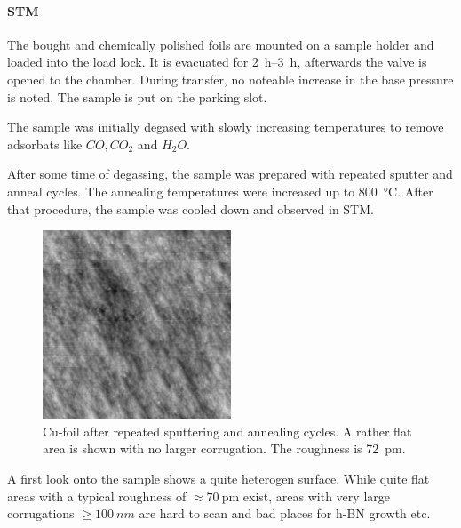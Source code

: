 \paragraph{STM}
The bought and chemically polished foils are mounted on a sample holder and loaded into the load lock. It is evacuated for \SIrange{2}{3}{\hour}, afterwards the valve is opened to the chamber. During transfer, no noteable increase in the base pressure is noted. The sample is put on the parking slot.

The sample was initially degased with slowly increasing temperatures to remove adsorbats like $CO, CO_2$ and $H_2O$.

After some time of degassing, the sample was prepared with repeated sputter and anneal cycles. The annealing temperatures were increased up to \SI{800}{\degreeCelsius}. 
After that procedure, the sample was cooled down and observed in STM.

\begin{figure}[h!]
 \centering
 \includegraphics[width=0.5\textwidth]{./images/F150331-125720.jpg}
 \caption{Cu-foil after repeated sputtering and annealing cycles. A rather flat area is shown with no larger corrugation. The roughness is \SI{72}{\pico\meter}.}
 \label{fig:cu-foil-clean}
\end{figure}

A first look onto the sample shows a quite heterogen surface. While quite flat areas with a typical roughness of $\approx \SI{70}{\pico\meter}$ exist, areas with very large corrugations $\geq \SI{100}{nm}$ are hard to scan and bad places for h-BN growth etc.